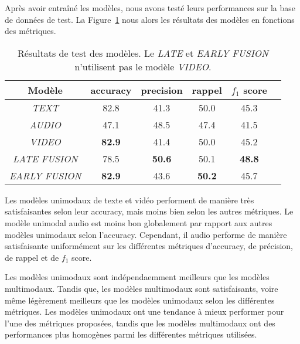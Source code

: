 Après avoir entraîné les modèles, nous avons testé leurs performances sur la base de données de test.
La Figure~\ref{tab: test} nous alors les résultats des modèles en fonctions des métriques.

\begin{table}[H]
    \centering
    \begin{tabular}{|c|c|c|c|c|c|}
        \hline
        Modèle & accuracy & precision & rappel & $f_1$ score\\
        \hline
        \textit{TEXT} & 82.8 & 41.3 & 50.0 & 45.3\\
        \hline
        \textit{AUDIO} & 47.1 & 48.5 & 47.4 & 41.5\\
        \hline
        \textit{VIDEO} & \textbf{82.9} & 41.4 & 50.0 & 45.2\\
        \hline
        \textit{LATE FUSION} & 78.5 & \textbf{50.6} & 50.1 & \textbf{48.8}\\
        \hline
        \textit{EARLY FUSION} & \textbf{82.9} & 43.6 & \textbf{50.2} & 45.7\\
        \hline
    \end{tabular}
    \caption{Résultats de test des modèles. Le \textit{LATE} et \textit{EARLY FUSION} n'utilisent pas le modèle \textit{VIDEO}.}
    \label{tab: test}
\end{table}

Les modèles unimodaux de texte et vidéo performent de manière très satisfaisantes selon leur accuracy, mais moins bien selon les autres métriques.
Le modèle unimodal audio est moins bon globalement par rapport aux autres modèles unimodaux selon l'accuracy. 
Cependant, il audio performe de manière satisfaisante uniformément sur les différentes métriques d'accuracy, de précision, de rappel et de $f_1$ score. 

Les modèles unimodaux sont indépendaemment meilleurs que les modèles multimodaux. Tandis que, les modèles multimodaux sont satisfaisants, voire même légèrement meilleurs que les modèles unimodaux selon les différentes métriques. 
Les modèles unimodaux ont une tendance à mieux performer pour l'une des métriques proposées, tandis que les modèles multimodaux ont des performances plus homogènes parmi les différentes métriques utilisées. 